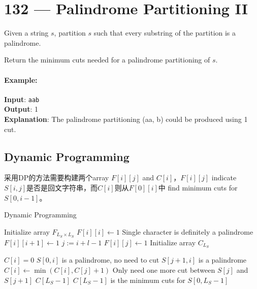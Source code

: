 \section{132 --- Palindrome Partitioning II}
Given a string $s$, partition $s$ such that every substring of the partition is a palindrome.
\par
Return the minimum cuts needed for a palindrome partitioning of $s$.
\paragraph{Example:}
\begin{flushleft}
\textbf{Input}: \texttt{aab}
\\
\textbf{Output}: 1
\\
\textbf{Explanation}: The palindrome partitioning (aa, b) could be produced using 1 cut.
\end{flushleft}
\subsection{Dynamic Programming}
采用DP的方法需要构建两个array $F[i][j]$ and $C[i]$，$F[i][j]$ indicate $S[i,j]$是否是回文字符串，而$C[i]$则从$F[0][i]$中 find minimum cuts for $S[0,i-1]$。
\setcounter{algorithm}{0}
\begin{algorithm}[H]
\caption{Dynamic Programming}
\begin{algorithmic}[1]
\State Initialize array $F_{L_S\times L_S}$
\State $F[i][i] \gets 1$ \Comment Single character is definitely a palindrome
\EndFor
{}
\State $F[i][i+1]\gets 1$
\EndIf
\EndFor
{}
\State $j:=i+l-1$
\State $F[i][j]\gets 1$
\EndIf
\EndFor
\EndFor
\State Initialize array $C_{L_S}$
\end{algorithmic}
\end{algorithm}
\begin{algorithm}[H]
\begin{algorithmic}[1]
\State $C[i]=0$ \Comment $S[0,i]$ is a palindrome, no need to cut
\Else
{}
 \Comment $S[j+1, i]$ is a palindrome
\State $C[i]\gets \min(C[i], C[j]+1)$ \Comment Only need one more cut between $S[j]$ and $S[j+1]$
\EndIf
\EndWhile
\EndIf
\EndFor
\State \Return $C[L_S-1]$ \Comment $C[L_S-1]$ is the minimum cuts for $S[0,L_S-1]$
\EndProcedure
\end{algorithmic}
\end{algorithm}
